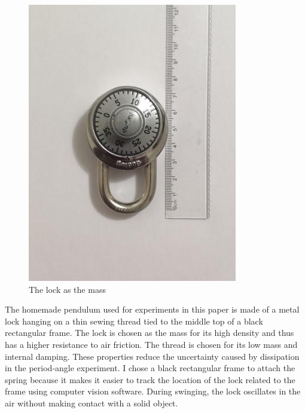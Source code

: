 \documentclass[12pt]{article}
\begin{document}
\begin{figure}[!htb]
\includegraphics[width=\linewidth]{img-lock.jpg}
\caption{The lock as the mass}\label{fig:lock}
\endminipage
\end{figure}

The homemade pendulum used for experiments in this paper is made of a metal lock hanging on a thin sewing thread tied to the middle top of a black rectangular frame. The lock is chosen as the mass for its high density and thus has a higher resistance to air friction. The thread is chosen for its low mass and internal damping. These properties reduce the uncertainty caused by dissipation in the period-angle experiment. I chose a black rectangular frame to attach the spring because it makes it easier to track the location of the lock related to the frame using computer vision software. During swinging, the lock oscillates in the air without making contact with a solid object.
\end{document}
